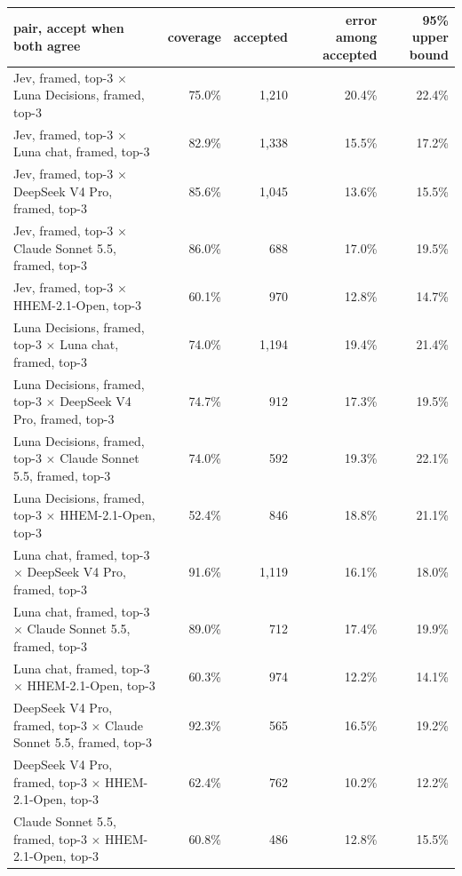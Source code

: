 \begin{tabular}{lrrrr}
\toprule
pair, accept when both agree & coverage & accepted & error among accepted & 95\% upper bound \\
\midrule
Jev, framed, top-3 $\times$ Luna Decisions, framed, top-3 & 75.0\% & 1,210 & 20.4\% & 22.4\% \\
Jev, framed, top-3 $\times$ Luna chat, framed, top-3 & 82.9\% & 1,338 & 15.5\% & 17.2\% \\
Jev, framed, top-3 $\times$ DeepSeek V4 Pro, framed, top-3 & 85.6\% & 1,045 & 13.6\% & 15.5\% \\
Jev, framed, top-3 $\times$ Claude Sonnet 5.5, framed, top-3 & 86.0\% & 688 & 17.0\% & 19.5\% \\
Jev, framed, top-3 $\times$ HHEM-2.1-Open, top-3 & 60.1\% & 970 & 12.8\% & 14.7\% \\
Luna Decisions, framed, top-3 $\times$ Luna chat, framed, top-3 & 74.0\% & 1,194 & 19.4\% & 21.4\% \\
Luna Decisions, framed, top-3 $\times$ DeepSeek V4 Pro, framed, top-3 & 74.7\% & 912 & 17.3\% & 19.5\% \\
Luna Decisions, framed, top-3 $\times$ Claude Sonnet 5.5, framed, top-3 & 74.0\% & 592 & 19.3\% & 22.1\% \\
Luna Decisions, framed, top-3 $\times$ HHEM-2.1-Open, top-3 & 52.4\% & 846 & 18.8\% & 21.1\% \\
Luna chat, framed, top-3 $\times$ DeepSeek V4 Pro, framed, top-3 & 91.6\% & 1,119 & 16.1\% & 18.0\% \\
Luna chat, framed, top-3 $\times$ Claude Sonnet 5.5, framed, top-3 & 89.0\% & 712 & 17.4\% & 19.9\% \\
Luna chat, framed, top-3 $\times$ HHEM-2.1-Open, top-3 & 60.3\% & 974 & 12.2\% & 14.1\% \\
DeepSeek V4 Pro, framed, top-3 $\times$ Claude Sonnet 5.5, framed, top-3 & 92.3\% & 565 & 16.5\% & 19.2\% \\
DeepSeek V4 Pro, framed, top-3 $\times$ HHEM-2.1-Open, top-3 & 62.4\% & 762 & 10.2\% & 12.2\% \\
Claude Sonnet 5.5, framed, top-3 $\times$ HHEM-2.1-Open, top-3 & 60.8\% & 486 & 12.8\% & 15.5\% \\
\bottomrule
\end{tabular}
